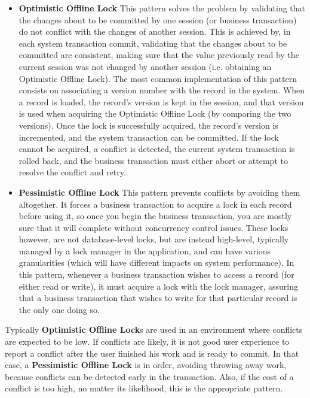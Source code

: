 \documentclass{llncs}
\begin{document}
\begin{itemize}
\item {\bf Optimistic Offline Lock} This pattern solves the problem by
  validating that the changes about to be committed by one session (or
  business transaction) do not conflict with the changes of another
  session. This is achieved by, in each system transaction commit,
  validating that the changes about to be committed are consistent,
  making sure that the value previously read by the current session
  was not changed by another session (i.e. obtaining an Optimistic
  Offline Lock).  The most common implementation of this pattern
  consists on associating a version number with the record in the
  system. When a record is loaded, the record's version is kept in the
  session, and that version is used when acquiring the Optimistic
  Offline Lock (by comparing the two versions). Once the lock is
  successfully acquired, the record's version is incremented, and the
  system transaction can be committed. If the lock cannot be acquired,
  a conflict is detected, the current system transaction is rolled
  back, and the business transaction must either abort or attempt to
  resolve the conflict and retry.

\item {\bf Pessimistic Offline Lock} This pattern prevents conflicts
  by avoiding them altogether. It forces a business transaction to
  acquire a lock in each record before using it, so once you begin the
  business transaction, you are mostly sure that it will complete
  without concurrency control issues. These locks however, are not
  database-level locks, but are instead high-level, typically managed
  by a lock manager in the application, and can have various
  granularities (which will have different impacts on system
  performance). In this pattern, whenever a business transaction
  wishes to access a record (for either read or write), it must
  acquire a lock with the lock manager, assuring that a business
  transaction that wishes to write for that particular record is the
  only one doing so.
\end{itemize}

Typically {\bf Optimistic Offline Lock}s are used in an environment
where conflicts are expected to be low. If conflicts are likely, it is
not good user experience to report a conflict after the user finished
his work and is ready to commit. In that case, a {\bf Pessimistic
  Offline Lock} is in order, avoiding throwing away work, because
conflicts can be detected early in the transaction. Also, if the cost
of a conflict is too high, no matter its likelihood, this is the
appropriate pattern.
\end{document}
